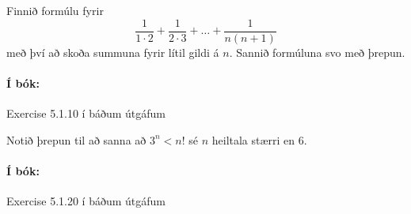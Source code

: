\documentclass{article}
\begin{document}
\question Finnið formúlu fyrir 
\[
 \frac{1}{1\cdot 2} + \frac{1}{2 \cdot 3} + \ldots + \frac{1}{n(n+1)}
\]
með því að skoða summuna fyrir lítil gildi á $n$. Sannið formúluna svo með þrepun.

\paragraph{Í bók:} Exercise 5.1.10 í báðum útgáfum

\question Notið þrepun til að sanna að $3^n < n!$ sé $n$ heiltala stærri en 6.

\paragraph{Í bók:} Exercise 5.1.20 í báðum útgáfum
\end{document}
